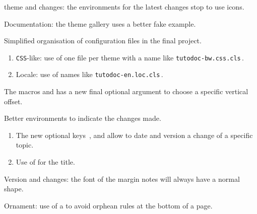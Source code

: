\begin{tdocupdate}
	\item {} theme and changes: the environments for the latest changes stop to use icons.

	\item Documentation: the theme gallery uses a better fake example.
\end{tdocupdate}



\begin{tdoctech}
	\item Simplified organisation of configuration files in the final project.
	\begin{enumerate}
		\item \texttt{CSS}-like: use of one file per theme with a name like \texttt{tutodoc-bw.css.cls}\,.

		\item Locale: use of names like \texttt{tutodoc-en.loc.cls}\,.
	\end{enumerate}
\end{tdoctech}

\tdocsep




\begin{tdocnew}[version = 1.6.2, date = 2024-10-30]
	\item The macros  and  has a new final optional argument  to choose a specific vertical offset.

	\item Better environments to indicate the changes made.
	\begin{enumerate}
        \item The new optional keys \,,  and  allow to date and version a change of a specific topic.

        \item Use of  for the title.
	\end{enumerate}
\end{tdocnew}


\begin{tdocupdate}
	\item Version and changes: the font of the margin notes will always have a normal shape.

	\item Ornament: use of a \tdoclatexin{\cleaders} to avoid orphean rules at the bottom of a page.
\end{tdocupdate}

